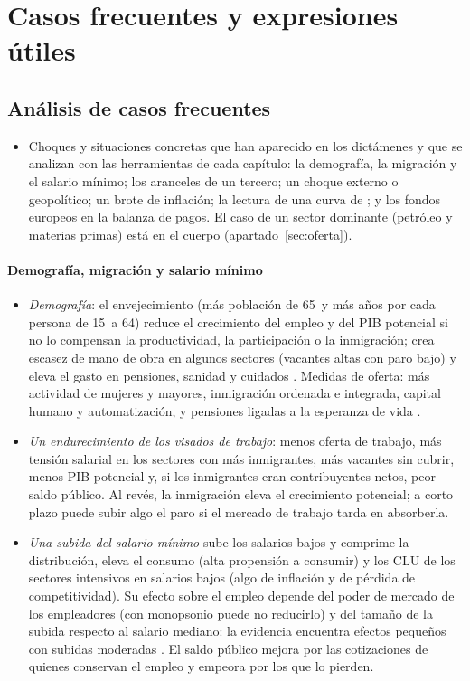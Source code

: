 \documentclass[11pt]{article}
\begin{document}
\section{Casos frecuentes y expresiones útiles}\label{anexo:casos}

\subsection{Análisis de casos frecuentes}\label{anexo:casos-frecuentes}

\begin{itemize}
\item Choques y situaciones concretas que han aparecido en los dictámenes y que se analizan con las herramientas de cada capítulo: la demografía, la migración y el salario mínimo; los aranceles de un tercero; un choque externo o geopolítico; un brote de inflación; la lectura de una curva de ; y los fondos europeos en la balanza de pagos. El caso de un sector dominante (petróleo y materias primas) está en el cuerpo (apartado~\ref{sec:oferta}).
\end{itemize}

\paragraph{Demografía, migración y salario mínimo}
\begin{itemize}
\item \emph{Demografía}: el envejecimiento (más población de 65~y más años por cada persona de 15~a 64) reduce el crecimiento del empleo y del PIB potencial si no lo compensan la productividad, la participación o la inmigración; crea escasez de mano de obra en algunos sectores (vacantes altas con paro bajo) y eleva el gasto en pensiones, sanidad y cuidados \parencite{CE2024Envejecimiento}. Medidas de oferta: más actividad de mujeres y mayores, inmigración ordenada e integrada, capital humano y automatización, y pensiones ligadas a la esperanza de vida .
\item \emph{Un endurecimiento de los visados de trabajo}: menos oferta de trabajo, más tensión salarial en los sectores con más inmigrantes, más vacantes sin cubrir, menos PIB potencial y, si los inmigrantes eran contribuyentes netos, peor saldo público. Al revés, la inmigración eleva el crecimiento potencial; a corto plazo puede subir algo el paro si el mercado de trabajo tarda en absorberla.
\item \emph{Una subida del salario mínimo} sube los salarios bajos y comprime la distribución, eleva el consumo (alta propensión a consumir) y los CLU de los sectores intensivos en salarios bajos (algo de inflación y de pérdida de competitividad). Su efecto sobre el empleo depende del poder de mercado de los empleadores (con monopsonio puede no reducirlo) y del tamaño de la subida respecto al salario mediano: la evidencia encuentra efectos pequeños con subidas moderadas \parencite{CardKrueger1994,Manning2021SMI} . El saldo público mejora por las cotizaciones de quienes conservan el empleo y empeora por los que lo pierden.
\end{itemize}
\end{document}
